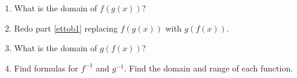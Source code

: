 \documentclass[12pt,dvipsnames]{article}
\begin{document}
\begin{enumerate}[label=\arabic*., leftmargin=2\parindent,
labelindent=\parindent, labelsep=*]
\begin{enumerate}
\begin{minipage}{\linewidth}
\centering
{} %
\begin{tabularx}{0.8\textwidth}{|X|X|X|X|X|X|X|X|}
\hline
\multicolumn{2}{|c|}{$x$}         & $0$ & $1$ & $2$ & $3$ & $4$ & 5  \\ \hline
\multicolumn{2}{|c|}{$f(g(x))$}   & & &     &     &    &         \\ \hline
\end{tabularx}
\end{minipage}
\item What is the domain of $\displaystyle f(g(x))$?
\item Redo part \ref{ettob1} replacing $f(g(x))$ with $g(f(x))$.
\item What is the domain of $\displaystyle g(f(x))$?
\item Find formulas for $\displaystyle f^{-1}$ and $g^{-1}$. Find the domain and range of each function.
\end{enumerate}


\end{enumerate}
		
\end{document}
